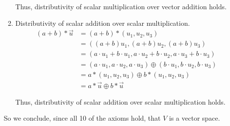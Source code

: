 \documentclass[12pt,letterpaper]{article}
\begin{document}
\begin{enumerate}
\begin{enumerate}
           Thus, distributivity of scalar multiplication over vector addition holds.
           
         \item Distributivity of scalar addition over scalar multiplication.
           \begin{align*}
             (a + b) * \vec{u} &= (a + b) * (u_1, u_2, u_3) \\
             &= ((a + b) u_1, (a + b) u_2, (a + b) u_3) \\
             &= (a \cdot u_1 + b \cdot u_1, a \cdot u_2 + b \cdot u_2, a \cdot u_3 + b \cdot u_3) \\
             &= (a \cdot u_1, a \cdot u_2, a \cdot u_3) \oplus (b \cdot u_1, b \cdot u_2, b \cdot u_3) \\
             &= a * (u_1, u_2, u_3) \oplus b * (u_1, u_2, u_3) \\
             &= a * \vec{u} \oplus b * \vec{u}
           \end{align*}
           
           Thus, distributivity of scalar addition over scalar multiplication holds.
       \end{enumerate}
       
       So we conclude, since all 10 of the axioms hold, that $V$ is a vector space.
       
  \end{enumerate}
\end{document}
